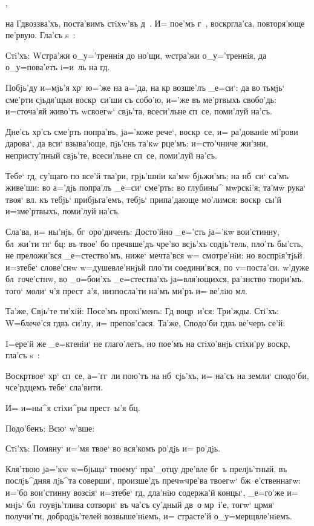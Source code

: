 ,

на Гд воззва'хъ, поста'вимъ стiхw'въ д~. И= пое'мъ 
г~, воскр гла'са, повторя'юще пе'рвую. Гла'съ s~:

Стi'хъ: W\т стра'жи о_у='треннiя до но'щи, w\т стра'жи 
о_у='треннiя, да о_у=пова'етъ i=и~ль на гд.

Побjь'ду и=мjь'я хр` ю='же на а='да, на кр 
возше'лъ _е=си`: да во тьмjь` сме'рти сjьдя'щыя 
воскр~си'ши съ собо'ю, и='же въ ме'ртвыхъ свобо'дь: 
и=сточа'яй живо'тъ w\т своегw` свjь'та, всеси'льне сп~се, 
поми'луй на'съ.

Дне'сь хр'съ сме'рть попра'въ, jа='коже рече`, 
воскр~се, и= ра'дованiе мi'рови дарова`, да вси` 
взыва'юще, пjь'снь та'кw рце'мъ: и=сто'чниче жи'зни, 
непристу'пный свjь'те, всеси'льне сп~се, поми'луй на'съ.

Тебе` гд, су'щаго по все'й тва'ри, грjь'шнiи ка'мw 
бjьжи'мъ; на нб~си` са'мъ живе'ши: во а='дjь попра'лъ 
_е=си` сме'рть: во глубины^ мwрскi'я; та'мw рука` твоя` 
вл. къ тебjь` прибjьга'емъ, тебjь` припа'дающе 
мо'лимся: воскр~сы'й и=з\ъ ме'ртвыхъ, поми'луй на'съ.

Сла'ва, и= ны'нjь, бг~оро'диченъ: Досто'йно _е='сть 
jа='кw вои'стинну, бл~жи'ти тя` бц: въ твое' бо 
преч вше'дъ чре'во всjь'хъ содjь'тель, пло'ть 
бы'сть, не преложи'вся _е=стество'мъ, ниже` мечта'вся w= 
смотре'нiи: но воспрiя'тjьй и=з\ъ тебе` слове'снw 
w=душевле'ннjьй пло'ти соедини'вся, по v=поста'си. 
w'дуже бл~гоче'стнw, во _о=бои'хъ _е=стества'хъ 
jа=вля'ющихся, ра'знство твори'мъ. того` моли` ч'я 
прест~а'я, низпосла'ти на'мъ ми'ръ и= ве'лiю мл.

Та'же, Свjь'те ти'хiй: Посе'мъ прокi'менъ: Гд 
воцр~и'ся: Три'жды. Стi'хъ: W=блече'ся гд въ си'лу, и= 
препоя'сася. Та'же, Сподо'би гд въ ве'черъ се'й: 

I=ере'й же _е=ктенiи` не глаго'летъ, но пое'мъ на 
стiхо'внjь стiхи'ру воскр, гла'съ s~:

Воскр твое` хр` сп~се, а='гг~ли пою'тъ на 
нб~сjь'хъ, и= на'съ на земли` сподо'би, ч се'рдцемъ 
тебе` сла'вити.

И= и=ны^я стiхи^ры прест~ы'я бц.

Подо'бенъ: Всю` w'вше:

Стi'хъ: Помяну` и='мя твое` во вся'комъ ро'дjь и= 
ро'дjь. 

Кля'твою jа='кw w=бjьща` твоему` пра'_отцу дре'вле 
бг~ъ прелjь'тный, въ послjь^дняя лjь^та соверши`, 
произше'дъ преч w\т чре'ва твоегw` бж~е'ственнагw: 
и='бо вои'стинну возсiя` и=з\ъ тебе` гд, дла'нiю 
содержа'й концы`, _е=го'же и= мнjь` бл~гоувjь'тлива 
сотвори` въ ча'съ су'дный дв~о мр~i'е, тогw` цр мя` 
получи'ти, добродjь'телей возвыше'нiемъ, и= страсте'й 
о_у=мерщвле'нiемъ.

